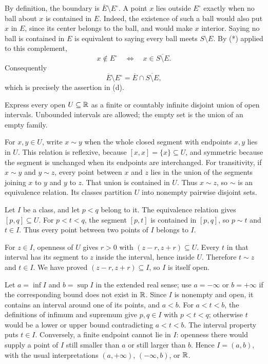 By definition, the boundary is $\overline E\setminus E^\circ$.
A point $x$ lies outside $E^\circ$ exactly when no ball about
$x$ is contained in $E$. Indeed, the existence of such a ball
would also put $x$ in $E$, since its center belongs to the ball,
and would make $x$ interior. Saying no ball is contained in $E$
is equivalent to saying every ball meets $S\setminus E$.
By (*) applied to this complement,
\[
 x\notin E^\circ\quad\Longleftrightarrow\quad
 x\in\overline{S\setminus E}.
\]
Consequently
\[
 \overline E\setminus E^\circ
 =\overline E\cap\overline{S\setminus E},
\]
which is precisely the assertion in (d).

\goal Express every open $U\subseteq\mathbb{R}$ as a finite or countably
infinite disjoint union of open intervals. Unbounded intervals are
allowed; the empty set is the union of an empty family.

For $x,y\in U$, write $x\sim y$ when the whole closed segment
with endpoints $x,y$ lies in $U$. This relation is reflexive,
because $[x,x]=\{x\}\subseteq U$, and symmetric because
the segment is unchanged when its endpoints are interchanged.
For transitivity, if $x\sim y$ and $y\sim z$, every point
between $x$ and $z$ lies in the union of the segments joining
$x$ to $y$ and $y$ to $z$. That union is contained in $U$.
Thus $x\sim z$, so $\sim$ is an equivalence relation.
Its classes partition $U$ into nonempty pairwise disjoint sets.

Let $I$ be a class, and let $p<q$ belong to it. The equivalence
relation gives $[p,q]\subseteq U$. For $p<t<q$, the segment
$[p,t]$ is contained in $[p,q]$, so $p\sim t$ and $t\in I$.
Thus every point between two points of $I$ belongs to $I$.

For $z\in I$, openness of $U$ gives $r>0$ with
$(z-r,z+r)\subseteq U$. Every $t$ in that interval has its
segment to $z$ inside the interval, hence inside $U$. Therefore
$t\sim z$ and $t\in I$. We have proved
$(z-r,z+r)\subseteq I$, so $I$ is itself open.

Let $a=\inf I$ and $b=\sup I$ in the extended real sense;
use $a=-\infty$ or $b=+\infty$ if the corresponding bound
does not exist in $\mathbb{R}$. Since $I$ is nonempty and open,
it contains an interval around one of its points, and $a<b$.
For $a<t<b$, the definitions of infimum and supremum give
$p,q\in I$ with $p<t<q$; otherwise $t$ would be a lower or
upper bound contradicting $a<t<b$. The interval property puts
$t\in I$. Conversely, a finite endpoint cannot lie in $I$:
openness there would supply a point of $I$ still smaller than
$a$ or still larger than $b$. Hence $I=(a,b)$, with the
usual interpretations $(a,+\infty)$, $(-\infty,b)$, or $\mathbb{R}$.

